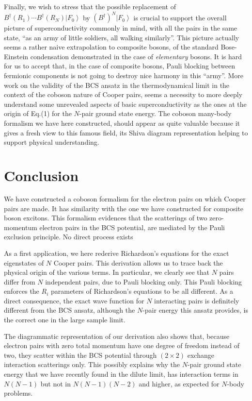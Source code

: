 \documentclass[epj]{svjour}
\begin{document}
Finally, we wish to stress that the possible replacement of $B^{\dagger}(R_1)\cdots{}B^{\dagger}(R_N)%
\left|F_0\right>  $ by $\left(B^{\dagger}\right) ^N\left|F_0\right>  $ is
crucial to support the overall picture of
superconductivity commonly in mind, with all the pairs in the same state, ``as an army of
little soldiers, all walking similarly''.  This picture actually seems a rather naive extrapolation to composite bosons, of the standard Bose-Einstein condensation demonstrated in the case of  \emph{elementary} bosons. It is hard for us to accept that, in the case of composite bosons, Pauli blocking between fermionic components is not going to destroy nice harmony in this ``army''.
More work on the validity of the BCS 
ansatz in the thermodynamical limit in the context of the coboson nature of Cooper pairs, seems a necessity to more deeply understand some unrevealed aspects of basic superconductivity as the ones at the origin of Eq.(1) for the $N$-pair ground state energy. The coboson many-body formalism we have here constructed, should appear as quite valuable because it gives a fresh view to this famous field, its Shiva diagram representation helping to support physical understanding.
 

\section{Conclusion}

We have constructed a coboson formalism for the electron pairs on which Cooper pairs are made. It has similarity with the one we have constructed for composite boson excitons. This formalism evidences that the scatterings of two zero-momentum electron pairs in the BCS potential, are mediated by the Pauli exclusion principle. No direct process exists


As a first application, we here rederive Richardson's equations for the exact eigenstates of $N$ Cooper pairs. This 
  derivation allows us to trace back
the physical origin of the various terms. In
particular, we clearly see that $N$ pairs differ from $N$ independent
pairs, due to Pauli blocking only. This Pauli blocking
enforces the $R_i$ parameters of Richardson's equations to be all different. 
As a direct consequence, the exact wave function for $N$ interacting pairs is 
definitely different from the BCS ansatz, although the $N$-pair energy this ansatz provides, is the correct one in the large sample limit. 

The diagrammatic
representation of our derivation also shows that, because electron pairs
with zero total momentum have one degree of freedom instead of two, they scatter within the BCS potential through 
$(2\times2)$ exchange interaction scatterings only. This possibly explains
why the $N$-pair ground state energy that we have recently found in the dilute limit, has interaction terms in $N(N-1)$ but not in $N(N-1)(N-2)
$ and higher, as expected for $N$-body problems.
\end{document}
